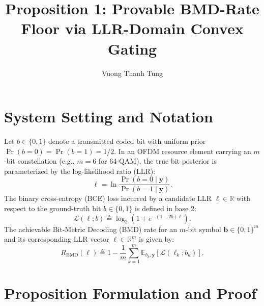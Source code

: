 \documentclass[journal,onecolumn]{IEEEtran}
\begin{document}
\title{Proposition 1: Provable BMD-Rate Floor via LLR-Domain Convex Gating}
\author{Vuong Thanh Tung}
\maketitle

\section{System Setting and Notation}

Let $b \in \{0, 1\}$ denote a transmitted coded bit with uniform prior $\Pr(b=0) = \Pr(b=1) = 1/2$. In an OFDM resource element carrying an $m$-bit constellation (e.g., $m=6$ for 64-QAM), the true bit posterior is parameterized by the log-likelihood ratio (LLR):
\begin{equation}
\ell = \ln \frac{\Pr(b=0 \mid \bm{y})}{\Pr(b=1 \mid \bm{y})}.
\end{equation}
The binary cross-entropy (BCE) loss incurred by a candidate LLR $\ell \in \mathbb{R}$ with respect to the ground-truth bit $b \in \{0, 1\}$ is defined in base 2:
\begin{equation}
\label{eq:bce_def}
\mathcal{L}(\ell; b) \triangleq \log_2 \left( 1 + e^{-(1 - 2b)\ell} \right).
\end{equation}
The achievable Bit-Metric Decoding (BMD) rate for an $m$-bit symbol $\bm{b} \in \{0, 1\}^m$ and its corresponding LLR vector $\bm{\ell} \in \mathbb{R}^m$ is given by:
\begin{equation}
\label{eq:bmd_def}
R_{\text{BMD}}(\bm{\ell}) \triangleq 1 - \frac{1}{m} \sum_{k=1}^m \mathbb{E}_{b_k, \bm{y}} \left[ \mathcal{L}(\ell_k; b_k) \right].
\end{equation}

\section{Proposition Formulation and Proof}
\end{document}
